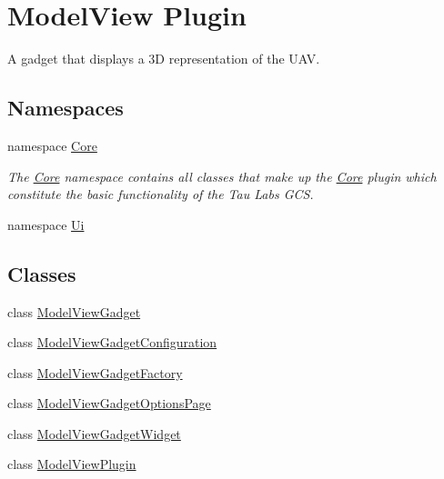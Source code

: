 \hypertarget{group___model_view_plugin}{\section{Model\-View Plugin}
\label{group___model_view_plugin}
}


A gadget that displays a 3\-D representation of the U\-A\-V.  


\subsection*{Namespaces}
\begin{DoxyCompactItemize}
\item 
namespace \hyperlink{namespace_core}{Core}
\begin{DoxyCompactList}\small\item\em The \hyperlink{namespace_core}{Core} namespace contains all classes that make up the \hyperlink{namespace_core}{Core} plugin which constitute the basic functionality of the Tau Labs G\-C\-S. \end{DoxyCompactList}\item 
namespace \hyperlink{namespace_ui}{Ui}
\end{DoxyCompactItemize}
\subsection*{Classes}
\begin{DoxyCompactItemize}
\item 
class \hyperlink{class_model_view_gadget}{Model\-View\-Gadget}
\item 
class \hyperlink{class_model_view_gadget_configuration}{Model\-View\-Gadget\-Configuration}
\item 
class \hyperlink{class_model_view_gadget_factory}{Model\-View\-Gadget\-Factory}
\item 
class \hyperlink{class_model_view_gadget_options_page}{Model\-View\-Gadget\-Options\-Page}
\item 
class \hyperlink{class_model_view_gadget_widget}{Model\-View\-Gadget\-Widget}
\item 
class \hyperlink{class_model_view_plugin}{Model\-View\-Plugin}
\end{DoxyCompactItemize}
